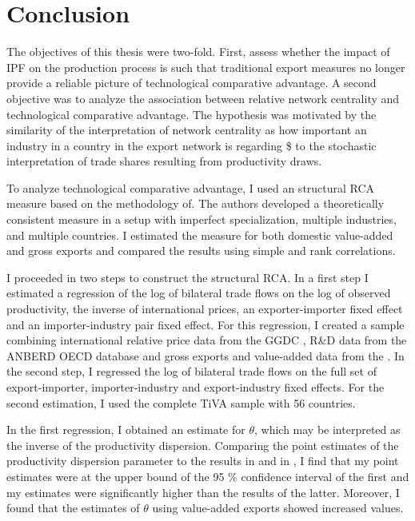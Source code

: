 \chapter{Conclusion}
The objectives of this thesis were two-fold.
First, assess whether the impact of IPF on the production process is such that traditional export measures no longer provide a reliable picture of technological comparative advantage.
A second objective was to analyze the association between relative network centrality and technological comparative advantage.
The hypothesis was motivated by the similarity of the interpretation of network centrality as how important an industry in a country in the export network is regarding \$ to the stochastic interpretation of trade shares resulting from productivity draws. \par
To analyze technological comparative advantage, I used an structural RCA measure based on the methodology of\textcite{costinot}.
The authors developed a theoretically consistent measure in a setup with imperfect specialization, multiple industries, and multiple countries.
 I estimated the measure for both domestic value-added and gross exports and compared the results using simple and rank correlations. \par
I proceeded in two steps to construct the structural RCA.
 In a first step I estimated a regression of the log of bilateral trade flows on the log of observed productivity, the inverse of international prices, an exporter-importer fixed effect and an importer-industry pair fixed effect.
  For this regression, I created a sample combining international relative price data from the GGDC \textcite{Inklaar2012}, R\&D data from the ANBERD OECD database and gross exports and value-added data from the \textcite{tiva2}.
  In the second step, I regressed the log of bilateral trade flows on the full set of export-importer, importer-industry and export-industry fixed effects.
   For the second estimation, I used the complete TiVA sample with 56 countries.  \par
In the first regression, I obtained an estimate for $\theta$, which may be interpreted as the inverse of the productivity dispersion.
 Comparing the point estimates of the productivity dispersion parameter to the results in \textcite{eaton} and in \textcite{costinot},
 I find that my point estimates were at the upper bound of the 95 \% confidence interval of the first and my estimates were significantly higher than the results of the latter.
  Moreover, I found that the estimates of $\theta$ using value-added exports showed increased values.
